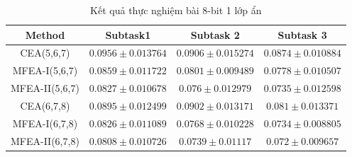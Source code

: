 \begin{table} [H]
    \begin{center}
        \caption{Kết quả thực nghiệm bài 8-bit 1 lớp ẩn}

    \begin{tabular}{|c|c|c|c|}
    \hline
    \multirow{1}{*}{\textbf{Method}} & \multicolumn{1}{c|}{\textbf{Subtask1}} & \multicolumn{1}{c|}{\textbf{Subtask 2}} & \multicolumn{1}{c|}{\textbf{Subtask 3}} \\ \hline
    CEA(5,6,7) & $0.0956 \pm 0.013764$ & $0.0906 \pm 0.015274$ & $0.0874 \pm 0.010884$ \\
    MFEA-I(5,6,7) & $0.0859 \pm 0.011722$ & $0.0801 \pm 0.009489$ & $0.0778 \pm 0.010507$  \\
    MFEA-II(5,6,7) & $\mathbf{0.0827 \pm 0.010678}$ & $\mathbf{0.076 \pm 0.012979}$ & $\mathbf{0.0735 \pm 0.012598}$ \\\hline
    
    CEA(6,7,8)& $0.0895 \pm 0.012499$ & $0.0902 \pm 0.013171$ & $0.081 \pm 0.013371$ \\
    MFEA-I(6,7,8)  & $0.0826 \pm 0.011089$ & $0.0768 \pm 0.010228$ & $0.0734 \pm 0.008805$ \\
    MFEA-II(6,7,8) & $\mathbf{0.0808 \pm 0.010726}$ & $\mathbf{0.0739 \pm 0.01117}$ & $\mathbf{0.072 \pm 0.009657}$ \\\hline
    \end{tabular}
    \end{center}
    \label{tab:result:nbit}
\end{table}

